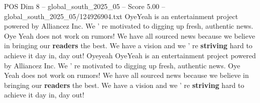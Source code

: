 \begin{textsample}{POS Dim 8 – global\_south\_2025\_05 – Score 5.00 – global\_south\_2025\_05/124926904.txt}
OyeYeah is an entertainment project powered by Alliancez Inc.
We ' re motivated to digging up fresh, authentic news.
Oye Yeah does not work on rumors!
We have all sourced news because we believe in bringing our \textbf{readers} the best.
We have a vision and we ' re \textbf{striving} hard to achieve it day in, day out!
Oyeyeah OyeYeah is an entertainment project powered by Alliancez Inc.
We ' re motivated to digging up fresh, authentic news.
Oye Yeah does not work on rumors!
We have all sourced news because we believe in bringing our \textbf{readers} the best.
We have a vision and we ' re \textbf{striving} hard to achieve it day in, day out!

\end{textsample}
